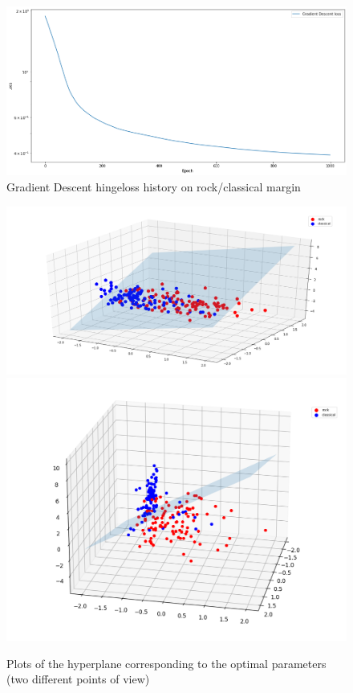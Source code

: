 \documentclass[12pt]{article}
\begin{document}
	\begin{figure}[H]
		\hspace{25pt}\includegraphics[scale=0.44]{gd1}
		\caption{Gradient Descent hingeloss history on rock/classical margin}
	\end{figure}
	\begin{figure}[H]
		\includegraphics[scale=0.4]{plane1}
		\includegraphics[scale=0.4]{plane1_side}
		\caption{Plots of the hyperplane corresponding to the optimal parameters (two different points of view)}
	\end{figure}
\end{document}
